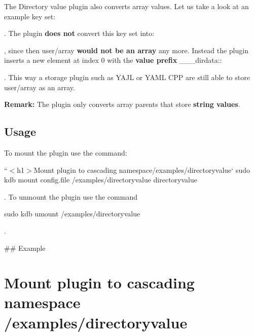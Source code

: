 The Directory value plugin also converts array values. Let us take a look at an example key set\+:




. The plugin {\bfseries does not} convert this key set into\+:




, since then {\ttfamily user/array} {\bfseries would not be an array} any more. Instead the plugin inserts a new element at index 0 with the {\bfseries value prefix} {\ttfamily \+\_\+\+\_\+\+\_\+dirdata\+:}\+:




. This way a storage plugin such as Y\+A\+JL or Y\+A\+ML C\+PP are still able to store {\ttfamily user/array} as an array.

{\bfseries Remark\+:} The plugin only converts array parents that store {\bfseries string values}.

\subsection*{Usage}

To mount the plugin use the command\+:

``{\ttfamily  $<$h1$>$Mount plugin to cascading namespace}/examples/directoryvalue` sudo kdb mount config.\+file /examples/directoryvalue directoryvalue 
\begin{DoxyCode}
. To unmount the plugin use the command
\end{DoxyCode}
 sudo kdb umount /examples/directoryvalue 
\begin{DoxyCode}
.

## Example
\end{DoxyCode}
 \section*{Mount plugin to cascading namespace {\ttfamily /examples/directoryvalue}}

